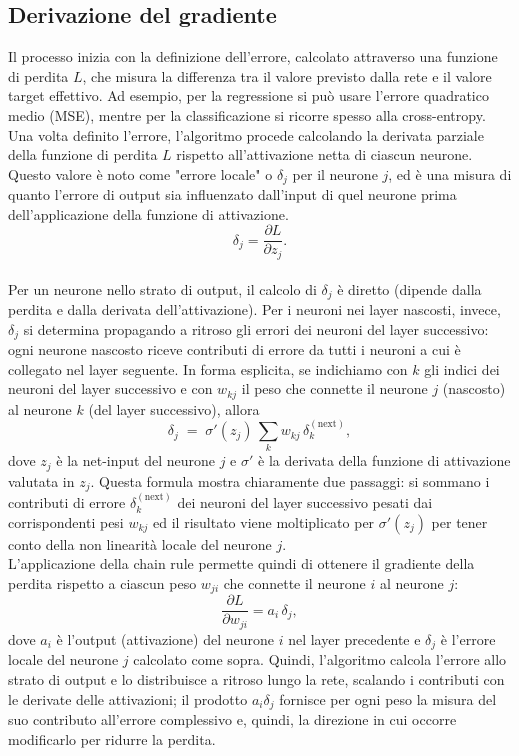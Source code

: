\documentclass[a4paper,12pt]{report}
\begin{document}
	\subsection{Derivazione del gradiente}
	Il processo inizia con la definizione dell'errore, calcolato attraverso una funzione di perdita \(L\), che misura la differenza tra il valore previsto dalla rete e il valore target effettivo. Ad esempio, per la regressione si può usare l'errore quadratico medio (MSE), mentre per la classificazione si ricorre spesso alla cross-entropy. \\
	Una volta definito l'errore, l'algoritmo procede calcolando la derivata parziale della funzione di perdita \(L\) rispetto all'attivazione netta di ciascun neurone. Questo valore è noto come "errore locale" o \(\delta_j\) per il neurone \(j\), ed è una misura di quanto l'errore di output sia influenzato dall'input di quel neurone prima dell'applicazione della funzione di attivazione.
	\[
	\delta_j = \frac{\partial L}{\partial z_j}.
	\]\\
	Per un neurone nello strato di output, il calcolo di \(\delta_j\) è diretto (dipende dalla perdita e dalla derivata dell'attivazione). Per i neuroni nei layer nascosti, invece, \(\delta_j\) si determina propagando a ritroso gli errori dei neuroni del layer successivo: ogni neurone nascosto riceve contributi di errore da tutti i neuroni a cui è collegato nel layer seguente. In forma esplicita, se indichiamo con \(k\) gli indici dei neuroni del layer successivo e con \(w_{k j}\) il peso che connette il neurone \(j\) (nascosto) al neurone \(k\) (del layer successivo), allora
	\[
	\delta_j \;=\; \sigma'(z_j)\,\sum_{k} w_{k j}\,\delta_k^{(\text{next})},
	\]
	dove \(z_j\) è la net-input del neurone \(j\) e \(\sigma'\) è la derivata della funzione di attivazione valutata in \(z_j\). Questa formula mostra chiaramente due passaggi: si sommano i contributi di errore \(\delta_k^{(\text{next})}\) dei neuroni del layer successivo pesati dai corrispondenti pesi \(w_{k j}\) ed il risultato viene moltiplicato per \(\sigma'(z_j)\) per tener conto della non linearità locale del neurone \(j\). \\
	L'applicazione della chain rule permette quindi di ottenere il gradiente della perdita rispetto a ciascun peso \(w_{ji}\) che connette il neurone \(i\) al neurone \(j\):
	\[
	\frac{\partial L}{\partial w_{ji}} = a_i\,\delta_j,
	\]
	dove \(a_i\) è l'output (attivazione) del neurone \(i\) nel layer precedente e \(\delta_j\) è l'errore locale del neurone \(j\) calcolato come sopra. Quindi, l'algoritmo calcola l'errore allo strato di output e lo distribuisce a ritroso lungo la rete, scalando i contributi con le derivate delle attivazioni; il prodotto \(a_i\delta_j\) fornisce per ogni peso la misura del suo contributo all'errore complessivo e, quindi, la direzione in cui occorre modificarlo per ridurre la perdita.
	
\end{document}
